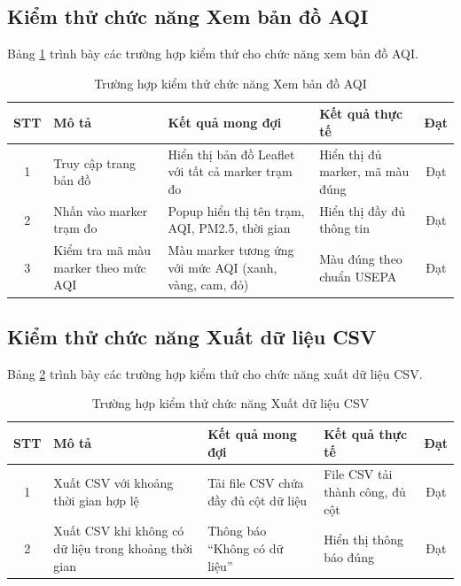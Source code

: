 \documentclass[../DoAn.tex]{subfiles}
\begin{document}
\subsection{Kiểm thử chức năng Xem bản đồ AQI}
\label{subsection:4.4.5}

Bảng \ref{table:test_map} trình bày các trường hợp kiểm thử cho chức năng xem bản đồ AQI.

\begin{table}[H]
\centering
\caption{Trường hợp kiểm thử chức năng Xem bản đồ AQI}
\label{table:test_map}
\small
\begin{tabularx}{\textwidth}{|c|X|X|X|c|}
\hline
\textbf{STT} & \textbf{Mô tả} & \textbf{Kết quả mong đợi} & \textbf{Kết quả thực tế} & \textbf{Đạt} \\
\hline
1 & Truy cập trang bản đồ & Hiển thị bản đồ Leaflet với tất cả marker trạm đo & Hiển thị đủ marker, mã màu đúng & Đạt \\
\hline
2 & Nhấn vào marker trạm đo & Popup hiển thị tên trạm, AQI, PM2.5, thời gian & Hiển thị đầy đủ thông tin & Đạt \\
\hline
3 & Kiểm tra mã màu marker theo mức AQI & Màu marker tương ứng với mức AQI (xanh, vàng, cam, đỏ) & Màu đúng theo chuẩn USEPA & Đạt \\
\hline
\end{tabularx}
\end{table}

\subsection{Kiểm thử chức năng Xuất dữ liệu CSV}
\label{subsection:4.4.6}

Bảng \ref{table:test_export} trình bày các trường hợp kiểm thử cho chức năng xuất dữ liệu CSV.

\begin{table}[H]
\centering
\caption{Trường hợp kiểm thử chức năng Xuất dữ liệu CSV}
\label{table:test_export}
\small
\begin{tabularx}{\textwidth}{|c|X|X|X|c|}
\hline
\textbf{STT} & \textbf{Mô tả} & \textbf{Kết quả mong đợi} & \textbf{Kết quả thực tế} & \textbf{Đạt} \\
\hline
1 & Xuất CSV với khoảng thời gian hợp lệ & Tải file CSV chứa đầy đủ cột dữ liệu & File CSV tải thành công, đủ cột & Đạt \\
\hline
2 & Xuất CSV khi không có dữ liệu trong khoảng thời gian & Thông báo ``Không có dữ liệu'' & Hiển thị thông báo đúng & Đạt \\
\hline
\end{tabularx}
\end{table}
\end{document}
